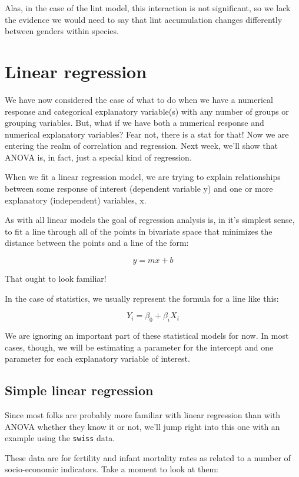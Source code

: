 \documentclass[
]{book}
\begin{document}
Alas, in the case of the lint model, this interaction is not significant, so we lack the evidence we would need to say that lint accumulation changes differently between genders within species.

\hypertarget{linear-regression}{%
\section{Linear regression}\label{linear-regression}}

We have now considered the case of what to do when we have a numerical response and categorical explanatory variable(s) with any number of groups or grouping variables. But, what if we have both a numerical response and numerical explanatory variables? Fear not, there is a stat for that! Now we are entering the realm of correlation and regression. Next week, we'll show that ANOVA is, in fact, just a special kind of regression.

When we fit a linear regression model, we are trying to explain relationships between some response of interest (dependent variable y) and one or more explanatory (independent) variables, x.

As with all linear models the goal of regression analysis is, in it's simplest sense, to fit a line through all of the points in bivariate space that minimizes the distance between the points and a line of the form:

\[y = mx + b\]

That ought to look familiar!

In the case of statistics, we usually represent the formula for a line like this:

\[Y_i = \beta_0 + \beta_i X_i\]

We are ignoring an important part of these statistical models for now. In most cases, though, we will be estimating a parameter for the intercept and one parameter for each explanatory variable of interest.

\hypertarget{simple-linear-regression}{%
\subsection{Simple linear regression}\label{simple-linear-regression}}

Since most folks are probably more familiar with linear regression than with ANOVA whether they know it or not, we'll jump right into this one with an example using the \texttt{swiss} data.

These data are for fertility and infant mortality rates as related to a number of socio-economic indicators. Take a moment to look at them:
\end{document}
